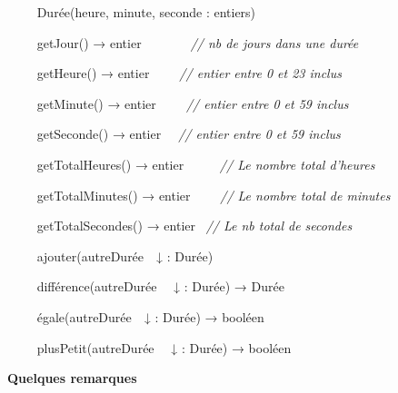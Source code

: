 {\sffamily
\ \ \ \  Durée(heure, minute, seconde :
entiers)}


\bigskip

{\sffamily
\ \ \ \  getJour() → entier~~~~~\textit{ \ \ //
nb de jours dans une durée}}

{\sffamily
\ \ \ \  getHeure() → entier~~\textit{ \ \ //
entier entre 0 et 23 inclus}}

{\sffamily
\ \ \ \  getMinute() → entier~ \textit{\ \ \ //
entier entre 0 et 59 inclus}}

{\sffamily
\ \ \ \  getSeconde() → entier\textit{ \ \ //
entier entre 0 et 59 inclus}}


\bigskip

{\sffamily
\ \ \ \  getTotalHeures() → entier~~~~~
\textit{// Le nombre total d’heures}}

{\sffamily
\ \ \ \  getTotalMinutes() → entier~~~~
\textit{// Le nombre total de minutes}}

{\sffamily
\ \ \ \  getTotalSecondes() → entier~\textit{ //
Le nb total de secondes}}


\bigskip

{\sffamily
\ \ \ \  ajouter(autreDurée~~↓ : Durée) }

{\sffamily
\ \ \ \  différence(autreDurée~~ ↓ : Durée) →
Durée}

{\sffamily
\ \ \ \  égale(autreDurée~~↓ : Durée) → booléen
}

{\sffamily
\ \ \ \  plusPetit(autreDurée~~ ↓ : Durée) →
booléen}

{\sffamily
{}}

{\bfseries
Quelques remarques}

